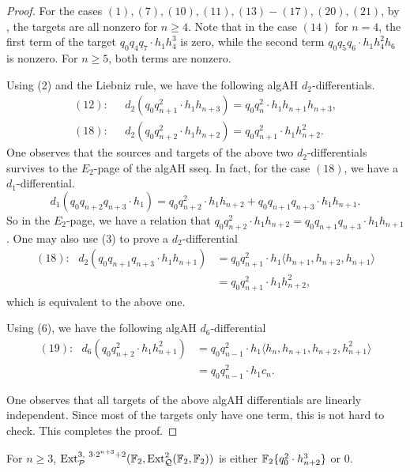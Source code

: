 \begin{proof}
For the cases $(1), (7), (10), (11), (13)-(17), (20), (21)$, by , the targets are all nonzero for $n \geq 4$. Note that in the case $(14)$ for $n=4$, the first term of the target $q_{0}q_{4}q_{7} \cdot h_1h_4^3$ is zero, while the second term $q_{0}q_{5}q_{6} \cdot h_1h_4^2h_{6}$ is nonzero. For $n \geq 5$, both terms are nonzero. 

Using (2) and the Liebniz rule, we have the following algAH $d_2$-differentials.
\begin{align*}
(12): \ \ \ & d_2(q_0q_{n+1}^2 \cdot h_1h_{n+3})  = q_0q_n^2 \cdot h_1h_{n+1}h_{n+3}, \\
(18): \ \ \ & d_2(q_0q_{n+2}^2 \cdot h_{1}h_{n+2})  = q_0q_{n+1}^2 \cdot h_1h_{n+2}^2. 
\end{align*}
One observes that the sources and targets of the above two $d_2$-differentials survives to the $E_2$-page of the algAH sseq. In fact, for the case $(18)$, we have a $d_1$-differential.
$$d_1(q_0q_{n+2}q_{n+3} \cdot h_1) = q_0q_{n+2}^2 \cdot h_1h_{n+2} + q_0q_{n+1}q_{n+3} \cdot h_1h_{n+1}.$$
So in the $E_2$-page, we have a relation that $q_0q_{n+2}^2 \cdot h_1h_{n+2} = q_0q_{n+1}q_{n+3} \cdot h_1h_{n+1}$. One may also use (3) to prove a $d_2$-differential 
\begin{align*}
(18): \ \ \ d_2(q_0q_{n+1}q_{n+3} \cdot h_1h_{n+1}) & = q_0q_{n+1}^2 \cdot h_1 \langle h_{n+1}, h_{n+2}, h_{n+1} \rangle \\
& = q_0q_{n+1}^2 \cdot h_1h_{n+2}^2,
\end{align*}
which is equivalent to the above one.

Using (6), we have the following algAH $d_6$-differential
\begin{align*}
(19): \ \ \ d_6(q_0q_{n+2}^2 \cdot h_1h_{n+1}^2) & = q_0q_{n-1}^2 \cdot h_1 \langle h_n, h_{n+1}, h_{n+2}, h_{n+1}^2 \rangle \\
& = q_0q_{n-1}^2 \cdot h_1c_n.
\end{align*}

One observes that all targets of the above algAH differentials are linearly independent.
Since most of the targets only have one term, this is not hard to check. This completes the proof.
\end{proof}


\begin{lem} \label{lem:q02hj3}
 For $n \geq 3$, $\operatorname{\mathrm{Ext}}^{3,\ 3\cdot 2^{n+3} + 2}_{\mathcal{P}}(\operatorname{\mathbb{F}}_2, \operatorname{\mathrm{Ext}}_{\mathcal{Q}}^2(\operatorname{\mathbb{F}}_2, \operatorname{\mathbb{F}}_2))$ is either $\operatorname{\mathbb{F}}_2\{q_0^2 \cdot h_{n+2}^3\}$ or $0$.
\end{lem}  

